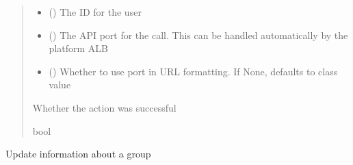 \documentclass[letterpaper,10pt,english]{sphinxmanual}
\begin{document}
\begin{fulllineitems}
\begin{fulllineitems}
\begin{quote}
\begin{description}
\begin{itemize}
\item {} 
\sphinxAtStartPar
{} () \textendash{} The ID for the user

\item {} 
\sphinxAtStartPar
{} (\sphinxstyleliteralemphasis{\sphinxupquote{ (}}\sphinxstyleliteralemphasis{\sphinxupquote{)}}) \textendash{} The API port for the call. This can be handled automatically by the platform ALB

\item {} 
\sphinxAtStartPar
{} (\sphinxstyleliteralemphasis{\sphinxupquote{ (}}\sphinxstyleliteralemphasis{\sphinxupquote{)}}) \textendash{} Whether to use port in URL formatting. If None, defaults to class value

\end{itemize}

\sphinxAtStartPar
{} \textendash{} Whether the action was successful

\sphinxAtStartPar
bool

\end{description}\end{quote}

\end{fulllineitems}


\begin{fulllineitems}
\label{\detokenize{aisquared.platform:aisquared.platform.AISquaredPlatformClient.AISquaredPlatformClient.update_group}}
\pysigstartsignatures
{}
\pysigstopsignatures
\sphinxAtStartPar
Update information about a group


\end{fulllineitems}
\end{fulllineitems}
\end{document}
